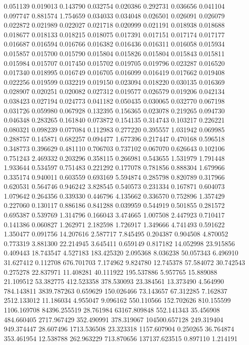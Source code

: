 0.051139
0.019013
0.143790
0.032754
0.020386
0.292731
0.036656
0.041104
0.097747
0.881574
1.754659
0.034033
0.034048
0.026501
0.026091
0.026079
0.022872
0.021989
0.022027
0.021718
0.020999
0.021191
0.018938
0.018688
0.018677
0.018133
0.018215
0.018075
0.017391
0.017151
0.017174
0.017177
0.016687
0.016594
0.016766
0.016382
0.016436
0.016311
0.016058
0.015934
0.015857
0.015700
0.015790
0.015804
0.015826
0.015804
0.015843
0.015811
0.015984
0.015707
0.017450
0.015702
0.019705
0.019796
0.023287
0.016520
0.017340
0.018995
0.016749
0.016705
0.016099
0.016419
0.017662
0.019408
0.022256
0.019599
0.032219
0.019150
0.023094
0.018220
0.030135
0.016369
0.028907
0.020251
0.020082
0.027312
0.019577
0.026579
0.019206
0.042134
0.038423
0.027194
0.024773
0.041182
0.050435
0.030065
0.032770
0.067198
0.031726
0.059980
0.067928
0.132395
0.156365
0.023078
0.219265
0.094730
0.046348
0.283265
0.161840
0.073872
0.154135
0.314743
0.103217
0.226221
0.080321
0.098239
0.077084
0.112983
0.277220
0.395557
1.031942
0.069985
0.288757
0.145871
0.682257
0.094477
1.677396
0.217447
0.470168
0.596518
0.348773
0.396629
0.481110
0.706703
0.737102
0.067070
0.626643
0.102106
0.751243
2.469332
0.203296
0.358115
0.266981
0.543655
1.531979
1.791448
1.933644
0.534597
0.751483
0.221292
0.177078
0.781856
0.888304
1.679966
0.335174
0.940011
0.603559
0.693169
5.594874
0.285798
0.820789
0.317966
0.620531
0.564746
0.946242
3.828545
0.540573
0.231334
0.167871
0.604073
1.079642
0.264356
0.339330
0.446796
4.135662
0.336570
0.752896
1.357429
0.227060
0.130117
0.886186
0.841288
0.039959
0.544919
0.501855
0.281572
0.695387
0.539769
1.314796
0.166043
3.474665
1.007508
2.447923
0.710417
0.141386
0.060827
1.262971
2.182598
1.726917
1.349666
4.741493
0.591622
1.350477
0.091756
14.207616
2.587717
7.845495
0.204387
0.904508
4.870052
0.773319
3.881300
22.214945
3.645411
0.659149
0.817182
14.052998
23.915856
0.409443
18.743547
4.527183
183.425320
2.095368
8.036238
50.057343
6.496910
31.627412
0.112708
676.701703
7.174962
9.824780
12.745378
57.584072
30.742543
0.275278
22.837971
11.408281
40.111922
195.537886
5.957765
15.889088
21.109512
53.382775
412.523358
378.530093
23.384561
13.373490
4.564990
784.143811
3839.787263
0.659629
150.026466
73.143657
67.312285
7.162837
2512.133012
11.186034
4.955047
9.096162
550.110566
152.702626
810.155599
1106.169708
84396.255519
28.761984
63167.809848
552.141343
35.456908
484.660405
2717.967429
352.490991
378.319067
104500.657128
249.319404
949.374447
28.607496
1713.536508
23.323318
1157.607904
0.250265
36.764874
353.461954
12.538788
262.963229
713.870656
137137.623515
0.897110
1.214191
